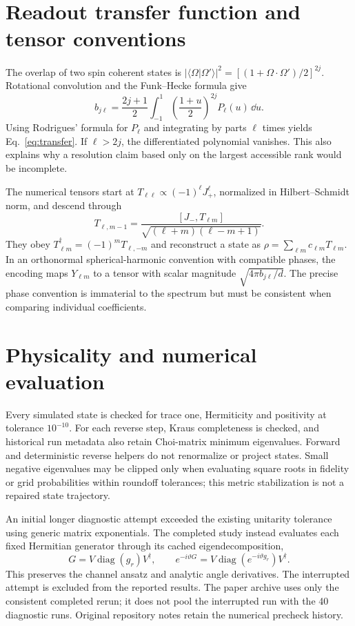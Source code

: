 \section{Readout transfer function and tensor conventions}
The overlap of two spin coherent states is
$|\langle\Omega|\Omega'\rangle|^2=[(1+\Omega\cdot\Omega')/2]^{2j}$.
Rotational convolution and the Funk--Hecke formula give
\begin{equation}
 b_{j\ell}=\frac{2j+1}{2}\int_{-1}^{1}
 \left(\frac{1+u}{2}\right)^{2j}P_\ell(u)\,\dd u.
\end{equation}
Using Rodrigues' formula for $P_\ell$ and integrating by parts $\ell$ times yields Eq.~\eqref{eq:transfer}. If $\ell>2j$, the differentiated polynomial vanishes. This also explains why a resolution claim based only on the largest accessible rank would be incomplete.

The numerical tensors start at $T_{\ell\ell}\propto(-1)^\ell J_+^\ell$, normalized in Hilbert--Schmidt norm, and descend through
\begin{equation}
 T_{\ell,m-1}=\frac{[J_-,T_{\ell m}]}{\sqrt{(\ell+m)(\ell-m+1)}}.
\end{equation}
They obey $T_{\ell m}^\dagger=(-1)^mT_{\ell,-m}$ and reconstruct a state as $\rho=\sum_{\ell m}c_{\ell m}T_{\ell m}$. In an orthonormal spherical-harmonic convention with compatible phases, the encoding maps $Y_{\ell m}$ to a tensor with scalar magnitude $\sqrt{4\pi b_{j\ell}/d}$. The precise phase convention is immaterial to the spectrum but must be consistent when comparing individual coefficients.

\section{Physicality and numerical evaluation}
Every simulated state is checked for trace one, Hermiticity and positivity at tolerance $10^{-10}$. For each reverse step, Kraus completeness is checked, and historical run metadata also retain Choi-matrix minimum eigenvalues. Forward and deterministic reverse helpers do not renormalize or project states. Small negative eigenvalues may be clipped only when evaluating square roots in fidelity or grid probabilities within roundoff tolerances; this metric stabilization is not a repaired state trajectory.

An initial longer diagnostic attempt exceeded the existing unitarity tolerance using generic matrix exponentials. The completed study instead evaluates each fixed Hermitian generator through its cached eigendecomposition,
\begin{equation}
 G=V\operatorname{diag}(g_r)V^\dagger,\qquad
 e^{-i\vartheta G}=V\operatorname{diag}(e^{-i\vartheta g_r})V^\dagger.
\end{equation}
This preserves the channel ansatz and analytic angle derivatives. The interrupted attempt is excluded from the reported results. The paper archive uses only the consistent completed rerun; it does not pool the interrupted run with the 40 diagnostic runs. Original repository notes retain the numerical precheck history.


